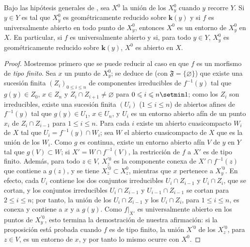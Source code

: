 \begin{proposition}[15.6.4]
\label{IV.15.6.4}
Bajo las hipótesis generales de , sea $X^0$ la unión de los $X_y^0$ cuando $y$ recorre $Y$.
Si $y\in Y$ es tal que $X_y^0$ es geométricamente reducido sobre $\boldsymbol{k}(y)$  y si $f$ es universalmente abierto en todo punto de $X_y^0$, entonces $X^0$ es un entorno de $X_y^0$ en $X$.
En particular, si $f$ es universalmente abierto y si, para todo $y\in Y$, $X_y^0$ es geométricamente reducido sobre $\boldsymbol{k}(y)$, $X^0$ es abierto en $X$.
\end{proposition}

\begin{proof}
Mostremos primero que se puede reducir al caso en que $f$ es un morfismo de \emph{tipo finito}.
Sea $x$ un punto de $X_y^0$; se deduce de  (con $\mathfrak{F}=\{\varnothing\}$) que existe una sucesión finita $(Z_i)_{0\leq i\leq n}$ de componentes irreducibles de $f^{-1}(y)$ tal que $g(y)\in Z_0$, $x\in Z_n$ y $Z_i\cap Z_{i+1}\neq\varnothing$ para $0\leq i\leq n\setmin 1$; como los $Z_i$ son irreducibles, existe una sucesión finita $(U_i)$ ($1\leq i\leq n$) de abiertos afines de $f^{-1}(y)$ tal que $g(y)\in U_1$, $x\in U_n$, y $U_i$ es un entorno abierto afín de un punto $x_i$ de $Z_i\cap Z_{i-1}$ para $1\leq i\leq n$.
Para cada $i$ existe un abierto cuasicompacto $W_i$ de $X$ tal que $U_i=f^{-1}(y)\cap W_i$; sea $W$ el abierto cuasicompacto de $X$ que es la unión de los $W_i$.
Como $g$ es continua, existe un entorno abierto afín $V$ de $y$ en $Y$ tal que $g(V)\subset W$; si $X'=W\cap f^{-1}(V)$, la restricción de $f$ a $X'$ es de tipo finito. Además, para todo $z\in V$, $X_z^{\prime 0}$ es la componente conexa de $X'\cap f^{-1}(z)$ que contiene a $g(z)$, y se tiene $X_z^{\prime 0}\subset X_z^0$, mientras que $x$ pertenece a $X_y^{\prime 0}$.
En efecto, cada $U_i$ contiene los dos conjuntos irreducibles $U_i\cap Z_{i-1}$
y $U_i\cap Z_i$, que se cortan, y los conjuntos irreducibles $U_i\cap Z_{i-1}$ y $U_{i-1}\cap Z_{i-1}$ se cortan para $2\leq i\leq n$; por tanto, la unión de los $U_i\cap Z_{i-1}$ y los $U_i\cap Z_i$, para $1\leq i\leq n$, es conexa y contiene a $x$ y a $g(y)$.
Como $f|_{X'}$ es universalmente abierto en los puntos de $X_y^{\prime 0}$, esto termina la demostración de nuestra afirmación: si la proposición está probada cuando $f$ es de tipo finito, la unión $X^{\prime 0}$ de los $X_z^{\prime 0}$, para $z\in V$, es un entorno de $x$, y por tanto lo mismo ocurre con $X^0$.


\end{proof}
